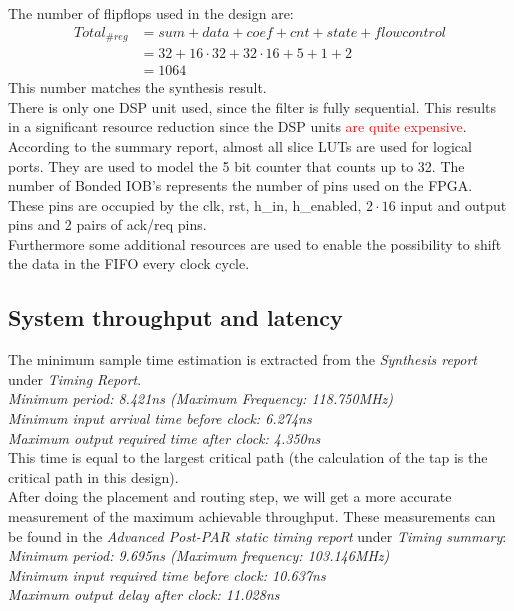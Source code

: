 \documentclass[a4paper,twoside,11pt, fleqn]{article}
\begin{document}
The number of flipflops used in the design are:
\begin{align*}
Total_{\#reg}	&= sum + data + coef + cnt + state + flow control\\
			&= 32 + 16\cdot 32 + 32\cdot 16 + 5 + 1 + 2\\
			&= 1064
\end{align*}
This number matches the synthesis result.\\

There is only one DSP unit used, since the filter is fully sequential. This results in a significant resource reduction since the DSP units \textcolor{red}{are quite expensive}. According to the summary report, almost all slice LUTs are used for logical ports. They are used to model the 5 bit counter that counts up to 32. The number of Bonded IOB's represents the number of pins used on the FPGA. These pins are occupied by the clk, rst, h\_in, h\_enabled,  $2\cdot 16$ input and output pins and 2 pairs of ack/req pins.\\

Furthermore some additional resources are used to enable the possibility to shift the data in the FIFO every clock cycle.

\subsection{System throughput and latency}
\label{sec:3athrolat}
The minimum sample time estimation is extracted from the \textit{Synthesis report} under \textit{Timing Report}.\\

   \textit{Minimum period: 8.421ns (Maximum Frequency: 118.750MHz)\\
   Minimum input arrival time before clock: 6.274ns\\
   Maximum output required time after clock: 4.350ns}\\

This time is equal to the largest critical path (the calculation of the tap is the critical path in this design).\\

After doing the placement and routing step, we will get a more accurate measurement of the maximum achievable throughput. These measurements can be found in the \textit{Advanced Post-PAR static timing report} under \textit{Timing summary}:\\

   \textit{Minimum period:   9.695ns   (Maximum frequency: 103.146MHz)\\
   Minimum input required time before clock:  10.637ns\\
   Maximum output delay after clock:  11.028ns}\\
\end{document}
